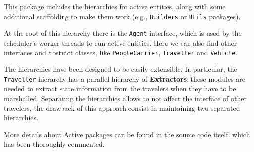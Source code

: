 This package includes the hierarchies for active entities, along with some
additional scaffolding to make them work
(e.g., \texttt{Builders} or \texttt{Utils} packages).

At the root of this hierarchy there is the \texttt{Agent} interface, which is
used by the scheduler's worker threads to run active entities. Here we can also
find other interfaces and abstract classes, like \texttt{PeopleCarrier},
\texttt{Traveller} and \texttt{Vehicle}.

The hierarchies have been designed to be easily extensible.
In particular, the \texttt{Traveller} hierarchy has a parallel hierarchy of
\textbf{Extractors}: these modules are needed to extract state information from
the travelers when they have to be marshalled.
Separating the hierarchies allows to not affect the interface
of other travelers, the drawback of this approach consist in maintaining
two separated hierarchies.


More details about Active packages can be found in the source code itself,
which has been thoroughly commented.
